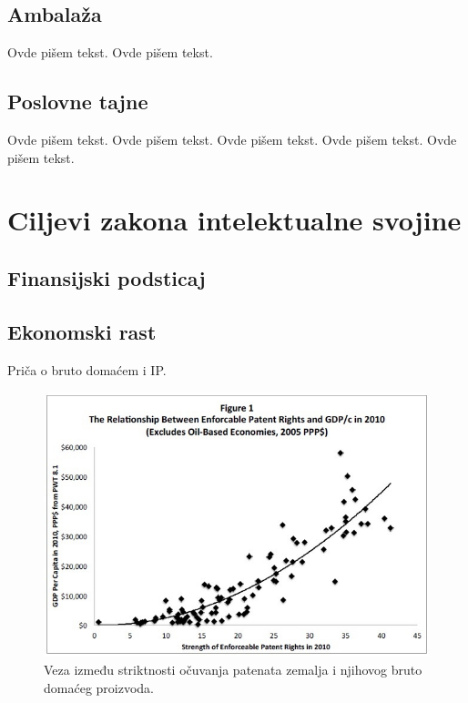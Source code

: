\documentclass[a4paper]{article}
\begin{document}
\subsection{Ambalaža}
\label{subsec:ambalaza}

Ovde pišem tekst. 
Ovde pišem tekst. 

\subsection{Poslovne tajne}
\label{subsec:poslovne}

Ovde pišem tekst. 
Ovde pišem tekst. 
Ovde pišem tekst. 
Ovde pišem tekst. 
Ovde pišem tekst. 

\section{Ciljevi zakona intelektualne svojine}

\subsection{Finansijski podsticaj}
\label{subsec:fin}

\subsection{Ekonomski rast}
\label{subsec:ekon}

Priča o bruto domaćem i IP.

\begin{figure}[h!]
\begin{center}
\includegraphics[scale=0.75]{patents_and_gdp.jpg}
\end{center}
\caption{Veza između striktnosti očuvanja patenata zemalja i njihovog bruto domaćeg proizvoda.}
\label{fig:pat_gdp}
\end{figure}
\end{document}

